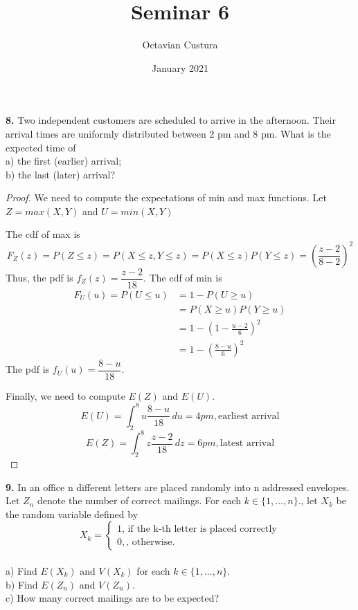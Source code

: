 \documentclass{article}
\title{Seminar 6}
\author{Octavian Custura }
\date{January 2021}
\begin{document}
\maketitle

\textbf{8. } Two independent customers are scheduled to arrive in the afternoon. Their arrival times are uniformly distributed between 2 pm and 8 pm. What is the expected time of \\
a) the first (earlier) arrival; \\
b) the last (later) arrival? \\

\begin{proof}
We need to compute the expectations of min and max functions.
Let $Z = max(X, Y)$ and $U = min(X, Y)$

The cdf of max is \[F_Z(z) = P(Z \leq z) = P(X \leq z, Y \leq z) = P(X \leq z)P(Y \leq z) = (\frac{z - 2}{8 - 2})^2\]
Thus, the pdf is $f_Z(z) = \dfrac{z-2}{18}$.
The cdf of min is 
\begin{equation*}
    \begin{split}
        F_U(u) = P(U \leq u) &= 1 - P(U \geq u) \\ &= P(X \geq u)P(Y \geq u) \\ &= 1 - (1 - \frac{u - 2}{6})^2 \\ &= 1 - ({\frac{8 - u}{6}})^{2}
    \end{split}
\end{equation*}
The pdf is $f_U(u) = \dfrac{8-u}{18}$.

Finally, we need to compute $E(Z)$ and $E(U)$.
\[ E(U) = \int_{2}^{8} u \dfrac{8 - u}{18} \, du = 4 pm, \text{earliest arrival} \]
\[ E(Z) = \int_{2}^{8} z \dfrac{z-2}{18}\, dz = 6 pm, \text{latest arrival}\]

\end{proof}
\textbf{9.}  In an office n different letters are placed randomly into n addressed envelopes. Let $Z_n$ denote the number of
correct mailings. For each $k \in \{1, . . . , n\}.$, let $X_k$ be the random variable defined by
$$
X_k = \begin{cases} 1 \text{, if the k-th letter is placed correctly} \\
0, \text{, otherwise.}\end{cases}$$ \\
a) Find $E(X_k)$ and $V (X_k)$ for each $k \in \{1, . . . , n\}.$ \\
b) Find $E(Z_n)$ and $V(Z_n)$.\\
c) How many correct mailings are to be expected? \\
\end{document}
